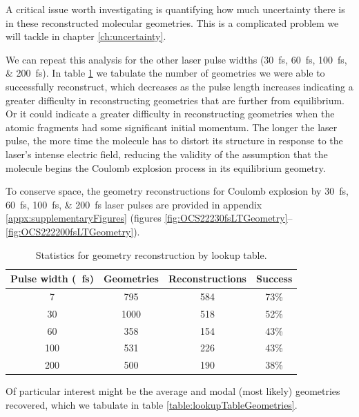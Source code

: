 A critical issue worth investigating is quantifying how much uncertainty there is in these reconstructed molecular geometries. This is a complicated problem we will tackle in chapter \ref{ch:uncertainty}.

We can repeat this analysis for the other laser pulse widths (\SIlist{30;60;100;200}{\fs}). In table \ref{table:lookupTableSuccess} we tabulate the number of geometries we were able to successfully reconstruct, which decreases as the pulse length increases indicating a greater difficulty in reconstructing geometries that are further from equilibrium. Or it could indicate a greater difficulty in reconstructing geometries when the atomic fragments had some significant initial momentum. The longer the laser pulse, the more time the molecule has to distort its structure in response to the laser's intense electric field, reducing the validity of the assumption that the molecule begins the Coulomb explosion process in its equilibrium geometry.

To conserve space, the geometry reconstructions for Coulomb explosion by \SIlist{30;60;100;200}{\fs} laser pulses are provided in appendix \ref{appx:supplementaryFigures} (figures \ref{fig:OCS22230fsLTGeometry}--\ref{fig:OCS222200fsLTGeometry}).

\begin{table}
  \myfloatalign
  \centering
  \begin{tabularx}{0.875\textwidth}{cccc}
    \toprule
    Pulse width (\SI{}{\fs}) & Geometries & Reconstructions & Success \\
    \midrule
    7 & 795 & 584 & 73\% \\
    30 & 1000 & 518 & 52\% \\
    60 & 358 & 154 & 43\% \\
    100 & 531 & 226 & 43\% \\
    200 & 500 & 190 & 38\% \\
    \bottomrule
  \end{tabularx}
  \caption[Statistics for geometry reconstruction by lookup table.]
  {Statistics for geometry reconstruction by lookup table.}
  \label{table:lookupTableSuccess}
\end{table}

Of particular interest might be the average and modal (most likely) geometries recovered, which we tabulate in table \ref{table:lookupTableGeometries}.

